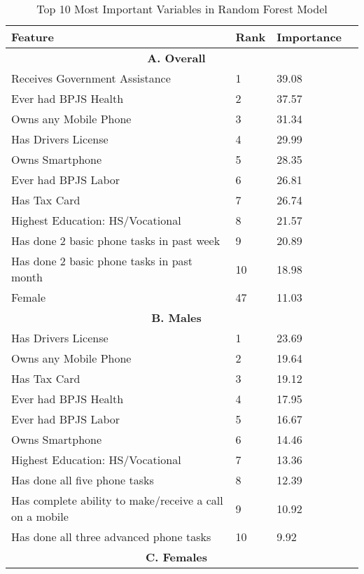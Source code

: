 \begin{table}[H] \begin{adjustbox}{max width=1.3\textwidth} \begin{threeparttable} \caption{Top 10 Most Important Variables in Random Forest Model} \label{varimpt} {\begin{tabular}{l*{1}{lll}} \hline \toprule {Feature}&{Rank}&{Importance} \\ \midrule \multicolumn{3}{c}{\textbf{A. Overall}} \\
\hline
Receives Government Assistance&        1&    39.08\\
Ever had BPJS Health&        2&    37.57\\
Owns any Mobile Phone&        3&    31.34\\
Has Drivers License&        4&    29.99\\
Owns Smartphone &        5&    28.35\\
Ever had BPJS Labor&        6&    26.81\\
Has Tax Card    &        7&    26.74\\
Highest Education: HS/Vocational&        8&    21.57\\
Has done 2 basic phone tasks in past week&        9&    20.89\\
Has done 2 basic phone tasks in past month&       10&    18.98\\
Female          &       47&    11.03\\
\midrule \multicolumn{3}{c}{\textbf{B. Males}} \\  
\hline
Has Drivers License&        1&    23.69\\
Owns any Mobile Phone&        2&    19.64\\
Has Tax Card    &        3&    19.12\\
Ever had BPJS Health&        4&    17.95\\
Ever had BPJS Labor&        5&    16.67\\
Owns Smartphone &        6&    14.46\\
Highest Education: HS/Vocational&        7&    13.36\\
Has done all five phone tasks&        8&    12.39\\
Has complete ability to make/receive a call on a mobile&        9&    10.92\\
Has done all three advanced phone tasks&       10&     9.92\\
\midrule \multicolumn{3}{c}{\textbf{C. Females}} \\  
\hline

\end{tabular}}
\end{threeparttable}
\end{adjustbox}
\end{table}
